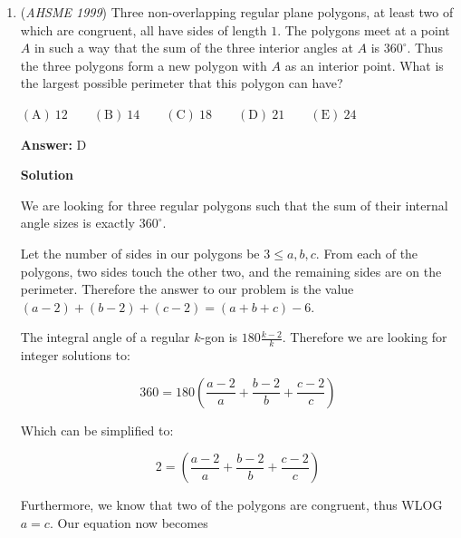 \begin{enumerate}
 \[\frac13 = \frac{7}{24} a_4 + \frac{7}{120} a_5 + \frac{7}{720} a_6 + \frac{a_7}{720}\]

 If $a_4 = 2$, $\frac{7}{24} a_4 = \frac{7}{12} > \frac13$, so $a_4 = 1$

 \[\frac{1}{24} = \frac{7}{120} a_5 + \frac{7}{720} a_6 + \frac{a_7}{720}\]

 If $a_5 = 1$, $\frac{7}{120} a_5 = \frac{7}{120} > \frac{1}{24}$, so $a_5 = 0$

 \[\frac{1}{24} =  \frac{7}{720} a_6 + \frac{a_7}{720}\]
$30 = 7 a_6 + a_7$. Since $a_7 < 7$, $a_7 = 2$ and $a_6=4$

 Therefore, $a_{2} + a_{3} + a_{4} + a_{5} + a_{6} + a_{7} = 1 + 1 + 1 + 0 + 4 + 2= \boxed{\textbf{(B) } 9}$.

 


	\item (\textit{AHSME 1999}) Three non-overlapping regular plane polygons, at least two of which are congruent, all have sides of length $1$. The polygons meet at a point $A$ in such a way that the sum of the three interior angles at $A$ is $360^{\circ}$. Thus the three polygons form a new polygon with $A$ as an interior point. What is the largest possible perimeter that this polygon can have? 


 $\mathrm{(A) \ }12 \qquad \mathrm{(B) \ }14 \qquad \mathrm{(C) \ }18 \qquad \mathrm{(D) \ }21 \qquad \mathrm{(E) \ } 24$

 \textbf{Answer: }D



\textbf{Solution}

We are looking for three regular polygons such that the sum of their internal angle sizes is exactly $360^{\circ}$. 

 Let the number of sides in our polygons be $3\leq a,b,c$. From each of the polygons, two sides touch the other two, and the remaining sides are on the perimeter. Therefore the answer to our problem is the value $(a-2)+(b-2)+(c-2) = (a+b+c)-6$.

 The integral angle of a regular $k$-gon is $180 \frac{k-2}k$. Therefore we are looking for integer solutions to:

 
 \[360 = 180\left( \frac{a-2}a + \frac{b-2}b + \frac{c-2}c \right)\]

 Which can be simplified to:

 
 \[2 = \left( \frac{a-2}a + \frac{b-2}b + \frac{c-2}c \right)\]

 Furthermore, we know that two of the polygons are congruent, thus WLOG $a=c$. Our equation now becomes


\end{enumerate}
